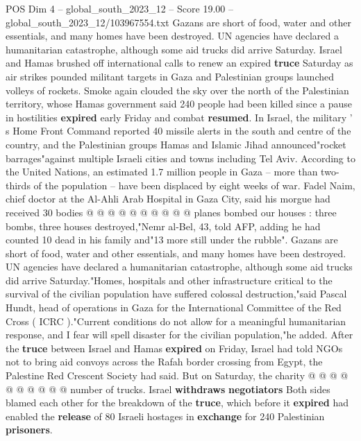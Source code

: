 \begin{textsample}{POS Dim 4 – global\_south\_2023\_12 – Score 19.00 – global\_south\_2023\_12/103967554.txt}  \label{ex:f4_pos_143}
Gazans are short of food, water and other essentials, and many homes have been destroyed.
UN agencies have declared a humanitarian catastrophe, although some aid trucks did arrive Saturday.
Israel and Hamas brushed off international calls to renew an expired \textbf{truce} Saturday as air strikes pounded militant targets in Gaza and Palestinian groups launched volleys of rockets.
Smoke again clouded the sky over the north of the Palestinian territory, whose Hamas government said 240 people had been killed since a pause in hostilities \textbf{expired} early Friday and combat \textbf{resumed}.
In Israel, the military ' s Home Front Command reported 40 missile alerts in the south and centre of the country, and the Palestinian groups Hamas and Islamic Jihad announced"rocket barrages"against multiple Israeli cities and towns including Tel Aviv.
According to the United Nations, an estimated 1.7 million people in Gaza -- more than two-thirds of the population -- have been displaced by eight weeks of war.
Fadel Naim, chief doctor at the Al-Ahli Arab Hospital in Gaza City, said his morgue had received 30 bodies @ @ @ @ @ @ @ @ @ @ planes bombed our houses : three bombs, three houses destroyed,"Nemr al-Bel, 43, told AFP, adding he had counted 10 dead in his family and"13 more still under the rubble".
Gazans are short of food, water and other essentials, and many homes have been destroyed.
UN agencies have declared a humanitarian catastrophe, although some aid trucks did arrive Saturday."Homes, hospitals and other infrastructure critical to the survival of the civilian population have suffered colossal destruction,"said Pascal Hundt, head of operations in Gaza for the International Committee of the Red Cross ( ICRC )."Current conditions do not allow for a meaningful humanitarian response, and I fear will spell disaster for the civilian population,"he added.
After the \textbf{truce} between Israel and Hamas \textbf{expired} on Friday, Israel had told NGOs not to bring aid convoys across the Rafah border crossing from Egypt, the Palestine Red Crescent Society had said.
But on Saturday, the charity @ @ @ @ @ @ @ @ @ @ number of trucks.
Israel \textbf{withdraws} \textbf{negotiators} Both sides blamed each other for the breakdown of the \textbf{truce}, which before it \textbf{expired} had enabled the \textbf{release} of 80 Israeli hostages in \textbf{exchange} for 240 Palestinian \textbf{prisoners}.

\end{textsample}
